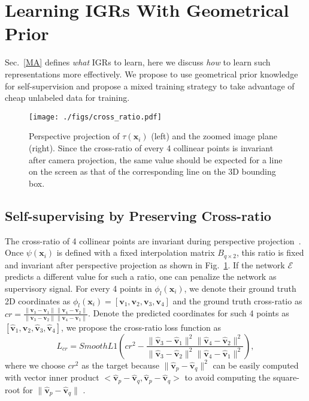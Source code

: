 \documentclass[final]{cvpr}
\begin{document}
\section{Learning IGRs With Geometrical Prior}
\label{PI}
Sec.~\ref{MA} defines \emph{what} IGRs to learn, here we discuss \emph{how} to learn such representations more effectively. We propose to use geometrical prior knowledge for self-supervision and propose a mixed training strategy to take advantage of cheap unlabeled data for training. 
\begin{figure}[h]
	\begin{center}
		\texttt{[image: ./figs/cross\_ratio.pdf]}
	\end{center}
	\caption{Perspective projection of $\tau(\mathbf{x}_i)$ (left) and the zoomed image plane (right). Since the cross-ratio of every 4 collinear points is invariant after camera projection, the same value should be expected for a line on the screen as that of the corresponding line on the 3D bounding box.}
	\label{fig:cr}
\end{figure}

\subsection{Self-supervising by Preserving Cross-ratio}
The cross-ratio of 4 collinear points are invariant during perspective projection~\cite{hartley2003multiple}. Once $\psi(\mathbf{x}_i)$ is defined with a fixed interpolation matrix $B_{q \times 2}$, this ratio is fixed and invariant after perspective projection as shown in Fig.~\ref{fig:cr}. If the network $\mathcal{E}$ predicts a different value for such a ratio, one can penalize the network as supervisory signal. For every 4 points in $\phi_l(\mathbf{x}_i)$, we denote their ground truth 2D coordinates as $\phi_l(\mathbf{x}_i) = [\mathbf{v}_1, \mathbf{v}_2, \mathbf{v}_3, \mathbf{v}_4]$ and the ground truth cross-ratio as $cr = \frac{\|\mathbf{v}_3 - \mathbf{v}_1\|\|\mathbf{v}_4 - \mathbf{v}_2\|}{\|\mathbf{v}_3 - \mathbf{v}_2\|\|\mathbf{v}_4 - \mathbf{v}_1\|}$. Denote the predicted coordinates for such 4 points as $[\hat{\mathbf{v}}_1, \hat{\mathbf{v}}_2, \hat{\mathbf{v}}_3, \hat{\mathbf{v}}_4]$, we propose the cross-ratio loss function as 
\begin{equation}
L_{cr} = SmoothL1(cr^2 - \frac{\|\hat{\mathbf{v}}_3 - \hat{\mathbf{v}}_1\|^2\|\hat{\mathbf{v}}_4 - \hat{\mathbf{v}}_2\|^2}
	{\|\hat{\mathbf{v}}_3 - \hat{\mathbf{v}}_2\|^2\|\hat{\mathbf{v}}_4 - \hat{\mathbf{v}}_1\|^2}),
\end{equation}
where we choose $cr^2$ as the target because $\|\hat{\mathbf{v}}_p - \hat{\mathbf{v}}_q\|^2$ can be easily computed with vector inner product $<\hat{\mathbf{v}}_p - \hat{\mathbf{v}}_q, \hat{\mathbf{v}}_p - \hat{\mathbf{v}}_q>$ to avoid computing the square-root for $\|\hat{\mathbf{v}}_p - \hat{\mathbf{v}}_q\|$ .
\end{document}
